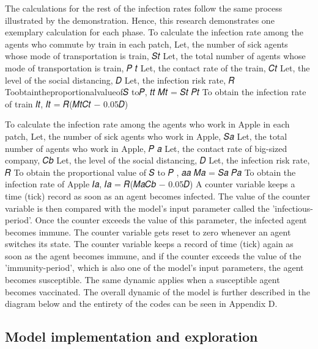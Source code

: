 \documentclass[smallextended]{svjour3}       %
\begin{document}
The calculations for the rest of the infection rates follow the same process illustrated by the demonstration. Hence, this research demonstrates one exemplary calculation for each phase.
To calculate the infection rate among the agents who commute by train in each patch,
Let, the number of sick agents whose mode of transportation is train, 𝑆𝑡
Let, the total number of agents whose mode of transportation is train, 𝑃 𝑡
Let, the contact rate of the train, 𝐶𝑡
Let, the level of the social distancing, 𝐷
Let, the infection risk rate, 𝑅
Toobtaintheproportionalvalueof𝑆 to𝑃, 𝑡𝑡
𝑀𝑡 = 𝑆𝑡 𝑃𝑡
To obtain the infection rate of train 𝐼𝑡,
𝐼𝑡 = 𝑅(𝑀𝑡𝐶𝑡 − 0.05𝐷)

To calculate the infection rate among the agents who work in Apple in each patch,
Let, the number of sick agents who work in Apple, 𝑆𝑎
Let, the total number of agents who work in Apple, 𝑃 𝑎
Let, the contact rate of big-sized company, 𝐶𝑏
Let, the level of the social distancing, 𝐷
Let, the infection risk rate, 𝑅
To obtain the proportional value of 𝑆 to 𝑃 , 𝑎𝑎
𝑀𝑎 = 𝑆𝑎 𝑃𝑎
To obtain the infection rate of Apple 𝐼𝑎,
𝐼𝑎 = 𝑅(𝑀𝑎𝐶𝑏 − 0.05𝐷)
A counter variable keeps a time (tick) record as soon as an agent becomes infected. The value of the counter variable is then compared with the model’s input parameter called the 'infectious- period'. Once the counter exceeds the value of this parameter, the infected agent becomes immune. The counter variable gets reset to zero whenever an agent switches its state.
The counter variable keeps a record of time (tick) again as soon as the agent becomes immune, and if the counter exceeds the value of the 'immunity-period', which is also one of the model’s input parameters, the agent becomes susceptible. The same dynamic applies when a susceptible agent becomes vaccinated. The overall dynamic of the model is further described in the diagram below and the entirety of the codes can be seen in Appendix D.

\subsection{Model implementation and exploration}
\end{document}
